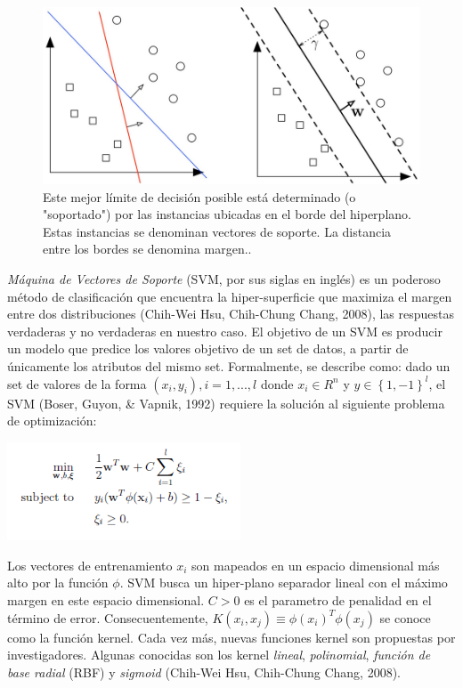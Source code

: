 \begin{figure}
    \centering
    \includegraphics[scale=1]{figuras/Capture1.PNG}
    \caption{Este mejor límite de decisión posible está determinado (o "soportado") por las instancias ubicadas en el borde del hiperplano. Estas instancias se denominan vectores de soporte.  La distancia entre los bordes se denomina margen..}
    \label{fig:my_label}
\end{figure}

\textit{Máquina de Vectores de Soporte} (SVM, por sus siglas en inglés) es un poderoso método de clasificación que encuentra la hiper-superficie que maximiza el margen entre dos distribuciones (Chih-Wei Hsu, Chih-Chung Chang, 2008), las respuestas verdaderas y no verdaderas en nuestro caso. El objetivo de un SVM es producir un modelo que predice los valores objetivo de un set de datos, a partir de únicamente los atributos del mismo set.  Formalmente, se describe como: dado un set de valores de la forma $(x_i,y_i), i=1, ..., l$  donde  $x_i \in R^n$ y $y\in\left\lbrace1,-1\right\rbrace^l$, el SVM (Boser, Guyon, \& Vapnik, 1992) requiere la solución al siguiente problema de optimización: 
\begin{center}
\includegraphics[height=1.15in]{figuras/Imagen1.png}
\end{center}
Los vectores de entrenamiento $x_i$ son mapeados en un espacio dimensional más alto por la función $\phi$. SVM busca un hiper-plano separador lineal con el máximo margen en este espacio dimensional. $C > 0$ es el parametro de penalidad en el término de error. Consecuentemente, $K(x_i,x_j)\equiv \phi(x_i )^T \phi(x_j)$ se conoce como la función kernel. Cada vez más, nuevas funciones kernel son propuestas por investigadores. Algunas conocidas son los kernel \textit{lineal}, \textit{polinomial}, \textit{función de base radial} (RBF) y \textit{sigmoid} (Chih-Wei Hsu, Chih-Chung Chang, 2008). 

